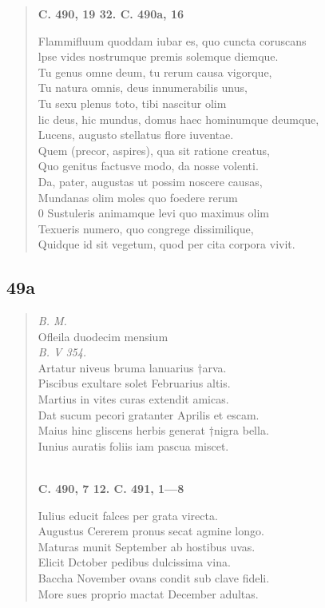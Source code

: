 \documentclass[11pt, a4paper]{report}
\begin{document}
\begin{verse}
    \begin{center} \textbf{C. 490, 19 32. C. 490a, 16} \end{center} \marginpar{[47]} Flammifluum quoddam iubar es, quo cuncta coruscans \\ lpse vides nostrumque premis solemque diemque. \\ Tu genus omne deum, tu rerum causa vigorque, \\ Tu natura omnis, deus innumerabilis unus, \\ Tu sexu plenus toto, tibi nascitur olim \\ lic deus, hic mundus, domus haec hominumque deumque, \\ Lucens, augusto stellatus flore iuventae. \\ Quem (precor, aspires), qua sit ratione creatus, \\ Quo genitus factusve modo, da nosse volenti. \\ Da, pater, augustas ut possim noscere causas, \\ Mundanas olim moles quo foedere rerum \\ 0 Sustuleris animamque levi quo maximus olim \\ Texueris numero, quo congrege dissimilique, \\ Quidque id sit vegetum, quod per cita corpora vivit. \\ 
      \end{verse}
  
            \subsection*{49a}
      \begin{verse}
      \textit{B. M.} \\ Ofleila duodecim mensium \\ \textit{B. V 354.} \\ Artatur niveus bruma lanuarius †arva. \\ Piscibus exultare solet Februarius altis. \\ Martius in vites curas extendit amicas. \\ Dat sucum pecori gratanter Aprilis et escam. \\ Maius hinc gliscens herbis generat †nigra bella. \\ Iunius auratis foliis iam pascua miscet. \\ 
        ﻿\pagebreak 
    \begin{center} \textbf{C. 490, 7 12. C. 491, 1—8} \end{center} \marginpar{[48]} Iulius educit falces per grata virecta. \\ Augustus Cererem pronus secat agmine longo. \\ Maturas munit September ab hostibus uvas. \\ Elicit Dctober pedibus dulcissima vina. \\ Baccha November ovans condit sub clave fideli. \\ More sues proprio mactat December adultas. \\ 
      \end{verse}
  
\end{document}
